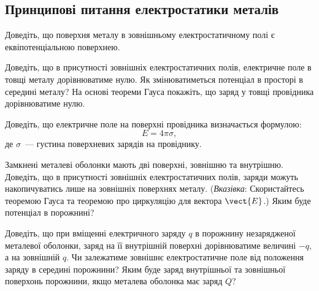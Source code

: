 \subsection*{Принципові питання електростатики металів}


\begin{problem}
	Доведіть, що поверхня металу в зовнішньому електростатичному полі є еквіпотенціальною поверхнею.
\end{problem}

\begin{problem}
	Доведіть, що в присутності зовнішніх електростатичних полів, електричне поле в товщі металу дорівнюватиме нулю. Як змінюватиметься потенціал в просторі в середині металу? На основі теореми Гауса покажіть, що заряд у товщі провідника дорівнюватиме нулю.
\end{problem}

\begin{problem}
	Доведіть, що електричне поле на поверхні провідника визначається формулою:
	\[
		E = 4\pi\sigma,
	\]
	\noindent де $\sigma$~--- густина поверхневих зарядів на провіднику.
\end{problem}

%


\begin{problem}
	Замкнені металеві оболонки мають дві поверхні, зовнішню та внутрішню. Доведіть, що в присутності зовнішніх електростатичних полів, заряди можуть накопичуватись лише на зовнішніх поверхнях металу. (\textit{Вказівка}: Скористайтесь теоремою Гауса та теоремою про циркуляцію для вектора $\vect{E}$.) Яким буде потенціал в порожнині?
\end{problem}


\begin{problem}
	Доведіть, що при вміщенні електричного заряду $q$ в порожнину незарядженої металевої оболонки, заряд на її внутрішній поверхні дорівнюватиме величині $-q$, а на зовнішній $q$. Чи залежатиме зовнішнє електростатичне поле від положення заряду в середині порожнини? Яким буде заряд внутрішньої та зовнішньої поверхонь порожнини, якщо металева оболонка має заряд $Q$?
\end{problem}



